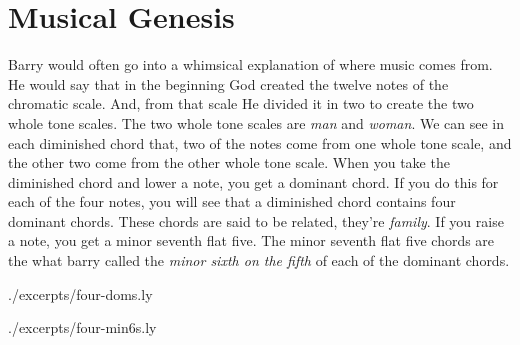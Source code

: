 \section{Musical Genesis}
Barry would often go into a whimsical explanation of where music comes from. He would say that in the beginning God created the twelve notes of the chromatic scale. And, from that scale He divided it in two to create the two whole tone scales. The two whole tone scales are \emph{man} and \emph{woman}. We can see in each diminished chord that, two of the notes come from one whole tone scale, and the other two come from the other whole tone scale. When you take the diminished chord and lower a note, you get a dominant chord. If you do this for each of the four notes, you will see that a diminished chord contains four dominant chords. These chords are said to be related, they're \emph{family}. If you raise a note, you get a minor seventh flat five. The minor seventh flat five chords are the what barry called the \emph{minor sixth on the fifth} of each of the dominant chords.




 {./excerpts/four-doms.ly}

 {./excerpts/four-min6s.ly}

